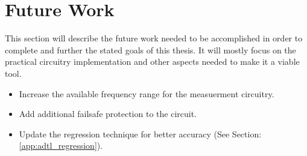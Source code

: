 \section {Future Work}

This section will describe the future work needed to be accomplished in order to complete and further the stated goals of this thesis. It will mostly focus on the practical circuitry implementation and other aspects needed to make it a viable tool.

\begin{itemize}
    \item Increase the available frequency range for the measuerment circuitry.
    \item Add additional failsafe protection to the circuit.
    \item Update the regression technique for better accuracy (See Section: \ref{app:adtl_regression}).
\end{itemize}

